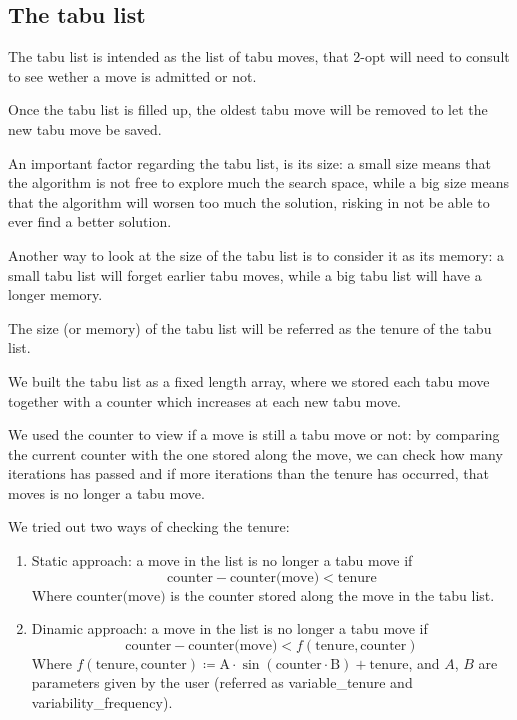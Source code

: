 \subsection{The tabu list}

The tabu list is intended as the list of tabu moves, that 2-opt will need to consult to see wether a move is admitted or not.

Once the tabu list is filled up, the oldest tabu move will be removed to let the new tabu move be saved.

An important factor regarding the tabu list, is its size: a small size means that the algorithm is not free to explore much the search space, while a big size means that the algorithm will worsen too much the solution, risking in not be able to ever find a better solution.

Another way to look at the size of the tabu list is to consider it as its memory: a small tabu list will forget earlier tabu moves, while a big tabu list will have a longer memory.

The size (or memory) of the tabu list will be referred as the tenure of the tabu list.

We built the tabu list as a fixed length array, where we stored each tabu move together with a counter which increases at each new tabu move.

We used the counter to view if a move is still a tabu move or not: by comparing the current counter with the one stored along the move, we can check how many iterations has passed and if more iterations than the tenure has occurred, that moves is no longer a tabu move.

We tried out two ways of checking the tenure:

\begin{enumerate}
    \item Static approach: a move in the list is no longer a tabu move if
    $$\text{counter}-\text{counter(move)} < \text{tenure}$$
    Where $\text{counter(move)}$ is the counter stored along the move in the tabu list.
    \item Dinamic approach: a move in the list is no longer a tabu move if
    $$\text{counter}-\text{counter(move)} < f(\text{tenure}, \text{counter})$$
    Where $f(\text{tenure},\text{counter})\coloneq \text{A}\cdot\sin(\text{counter}\cdot\text{B}) + \text{tenure}$, and $A$, $B$ are parameters given by the user (referred as variable\_tenure and variability\_frequency).
\end{enumerate}

